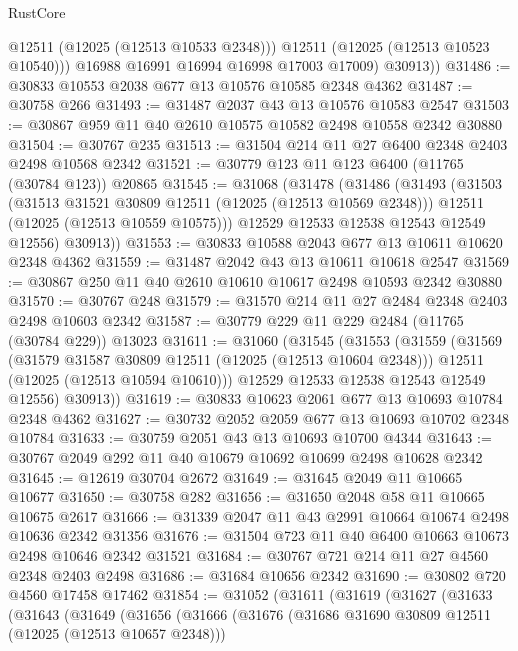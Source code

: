 \begin{lexlean}{RustCore}
\begin{coremodule}
              @12511
              (@12025 (@12513 @10533 @2348)))
            @12511
            (@12025 (@12513 @10523 @10540)))
          @16988
          @16991
          @16994
          @16998
          @17003
          @17009)
        @30913))
@31486 := @30833 @10553 @2038 @677 @13 @10576 @10585 @2348 @4362
@31487 := @30758 @266
@31493 := @31487 @2037 @43 @13 @10576 @10583 @2547
@31503 := @30867 @959 @11 @40 @2610 @10575 @10582 @2498 @10558 @2342 @30880
@31504 := @30767 @235
@31513 := @31504 @214 @11 @27 @6400 @2348 @2403 @2498 @10568 @2342
@31521 := @30779 @123 @11 @123 @6400 (@11765 (@30784 @123)) @20865
@31545 := @31068
    (@31478
      (@31486
        (@31493
          (@31503
            (@31513 @31521 @30809 @12511 (@12025 (@12513 @10569 @2348)))
            @12511
            (@12025 (@12513 @10559 @10575)))
          @12529
          @12533
          @12538
          @12543
          @12549
          @12556)
        @30913))
@31553 := @30833 @10588 @2043 @677 @13 @10611 @10620 @2348 @4362
@31559 := @31487 @2042 @43 @13 @10611 @10618 @2547
@31569 := @30867 @250 @11 @40 @2610 @10610 @10617 @2498 @10593 @2342 @30880
@31570 := @30767 @248
@31579 := @31570 @214 @11 @27 @2484 @2348 @2403 @2498 @10603 @2342
@31587 := @30779 @229 @11 @229 @2484 (@11765 (@30784 @229)) @13023
@31611 := @31060
    (@31545
      (@31553
        (@31559
          (@31569
            (@31579 @31587 @30809 @12511 (@12025 (@12513 @10604 @2348)))
            @12511
            (@12025 (@12513 @10594 @10610)))
          @12529
          @12533
          @12538
          @12543
          @12549
          @12556)
        @30913))
@31619 := @30833 @10623 @2061 @677 @13 @10693 @10784 @2348 @4362
@31627 := @30732 @2052 @2059 @677 @13 @10693 @10702 @2348 @10784
@31633 := @30759 @2051 @43 @13 @10693 @10700 @4344
@31643 := @30767 @2049 @292 @11 @40 @10679 @10692 @10699 @2498 @10628 @2342
@31645 := @12619 @30704 @2672
@31649 := @31645 @2049 @11 @10665 @10677
@31650 := @30758 @282
@31656 := @31650 @2048 @58 @11 @10665 @10675 @2617
@31666 := @31339 @2047 @11 @43 @2991 @10664 @10674 @2498 @10636 @2342 @31356
@31676 := @31504 @723 @11 @40 @6400 @10663 @10673 @2498 @10646 @2342 @31521
@31684 := @30767 @721 @214 @11 @27 @4560 @2348 @2403 @2498
@31686 := @31684 @10656 @2342
@31690 := @30802 @720 @4560 @17458 @17462
@31854 := @31052
    (@31611
      (@31619
        (@31627
          (@31633
            (@31643
              (@31649
                (@31656
                  (@31666
                    (@31676
                      (@31686 @31690 @30809 @12511 (@12025 (@12513 @10657 @2348)))

\end{coremodule}
\end{lexlean}
